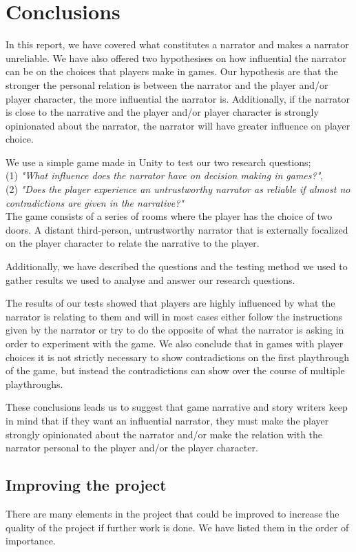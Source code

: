 \section{Conclusions}
In this report, we have covered what constitutes a narrator and makes a narrator unreliable. We have also offered two hypothesises on how influential the narrator can be on the choices that players make in games. Our hypothesis are that the stronger the personal relation is between the narrator and the player and/or player character, the more influential the narrator is. Additionally, if the narrator is close to the narrative and the player and/or player character is strongly opinionated about the narrator, the narrator will have greater influence on player choice.

We use a simple game made in Unity to test our two research questions; 
\\(1) \textit{"What influence does the narrator have on decision making in games?"}, 
\\(2) \textit{"Does the player experience an untrustworthy narrator as reliable if almost no contradictions are given in the narrative?"}
\\The game consists of a series of rooms where the player has the choice of two doors. A distant third-person, untrustworthy narrator that is externally focalized on the player character to relate the narrative to the player.

Additionally, we have described the questions and the testing method we used to gather results we used to analyse and answer our research questions.

The results of our tests showed that players are highly influenced by what the narrator is relating to them and will in most cases either follow the instructions given by the narrator or try to do the opposite of what the narrator is asking in order to experiment with the game. We also conclude that in games with player choices it is not strictly necessary to show contradictions on the first playthrough of the game, but instead the contradictions can show over the course of multiple playthroughs.

These conclusions leads us to suggest that game narrative and story writers keep in mind that if they want an influential narrator, they must make the player strongly opinionated about the narrator and/or make the relation with the narrator personal to the player and/or the player character.

\subsection{Improving the project}
There are many elements in the project that could be improved to increase the quality of the project if further work is done. We have listed them in the order of importance.

